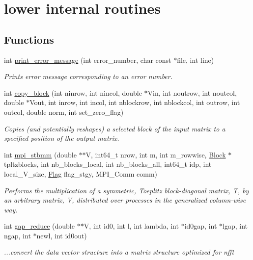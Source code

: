 \hypertarget{group__group22}{\section{lower internal routines}
\label{group__group22}
}
\subsection*{Functions}
\begin{DoxyCompactItemize}
\item 
int \hyperlink{group__group22_ga24331a8efb6e0b77df7c645ef45b2830}{print\-\_\-error\-\_\-message} (int error\-\_\-number, char const $\ast$file, int line)
\begin{DoxyCompactList}\small\item\em Prints error message corresponding to an error number. \end{DoxyCompactList}\item 
int \hyperlink{group__group22_ga7dddc7df6f787d6aa92dfc25e9d0465a}{copy\-\_\-block} (int ninrow, int nincol, double $\ast$Vin, int noutrow, int noutcol, double $\ast$Vout, int inrow, int incol, int nblockrow, int nblockcol, int outrow, int outcol, double norm, int set\-\_\-zero\-\_\-flag)
\begin{DoxyCompactList}\small\item\em Copies (and potentially reshapes) a selected block of the input matrix to a specified position of the output matrix. \end{DoxyCompactList}\item 
int \hyperlink{group__group22_gaa7ea4ac654fcb9f5fe3bad139febb65d}{mpi\-\_\-stbmm} (double $\ast$$\ast$V, int64\-\_\-t nrow, int m, int m\-\_\-rowwise, \hyperlink{structBlock}{Block} $\ast$tpltzblocks, int nb\-\_\-blocks\-\_\-local, int nb\-\_\-blocks\-\_\-all, int64\-\_\-t idp, int local\-\_\-\-V\-\_\-size, \hyperlink{structFlag}{Flag} flag\-\_\-stgy, M\-P\-I\-\_\-\-Comm comm)
\begin{DoxyCompactList}\small\item\em Performs the multiplication of a symmetric, Toeplitz block-\/diagonal matrix, T, by an arbitrary matrix, V, distributed over processes in the generalized column-\/wise way. \end{DoxyCompactList}\item 
int \hyperlink{group__group22_ga8c05d2ff1d358740d1c8965040e7080a}{gap\-\_\-reduce} (double $\ast$$\ast$V, int id0, int l, int lambda, int $\ast$id0gap, int $\ast$lgap, int ngap, int $\ast$newl, int id0out)
\begin{DoxyCompactList}\small\item\em ...convert the data vector structure into a matrix structure optimized for nfft \end{DoxyCompactList}\end{DoxyCompactItemize}


